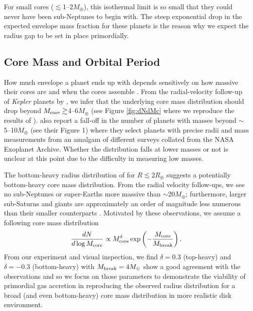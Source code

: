 \documentclass[twocolumn]{aastex631}
\begin{document}
For small cores ($\lesssim$1--2$M_\oplus$), this isothermal limit is so small that they could never have been sub-Neptunes to begin with. The steep exponential drop in the expected envelope mass fraction for these planets is the reason why we expect the radius gap to be set in place primordially.

\subsection{Core Mass and Orbital Period}
\label{ssec:mass_time_per}

How much envelope a planet ends up with depends sensitively on how massive their cores are and when the cores assemble \citep{Lee19}. From the radial-velocity follow-up of {\it Kepler} planets by \citet{Marcy14}, we infer that the underlying core mass distribution should drop beyond $M_{\rm core} \gtrsim$4--6$M_\oplus$ (see Figure \ref{fig:dNdMc} where we reproduce the results of \citet{Marcy14}). \citet{Otegi20} also report a fall-off in the number of planets with masses beyond $\sim$5--10$M_\oplus$ (see their Figure 1) where they select planets with precise radii and mass measurements from an amalgam of different surveys collated from the NASA Exoplanet Archive. Whether the distribution falls at lower masses or not is unclear at this point due to the difficulty in measuring low masses. 

The bottom-heavy radius distribution of \citet{Hsu19} for $R \lesssim 2R_\oplus$ suggests a potentially bottom-heavy core mass distribution. From the radial velocity follow-ups, we see no sub-Neptunes or super-Earths more massive than $\sim$20$M_\oplus$; furthermore, larger sub-Saturns and giants are approximately an order of magnitude less numerous than their smaller counterparts \citep[e.g.,][]{Howard10,fressin13,petigura13}. Motivated by these observations, we assume a following core mass distribution
\begin{equation}
    \frac{dN}{d\log M_{\rm core}} \propto M_{\rm core}^{\delta} \exp\left(-\frac{M_{\rm core}}{M_{\rm break}}\right).
    \label{eq:dNdlogMc}
\end{equation}
From our experiment and visual inspection, we find $\delta=0.3$ (top-heavy) and $\delta=-0.3$ (bottom-heavy) with $M_{\rm break}=4M_\oplus$ show a good agreement with the observations and so we focus on those parameters to demonstrate the viability of primordial gas accretion in reproducing the observed radius distribution for a broad (and even bottom-heavy) core mass distribution in more realistic disk environment.
\end{document}
